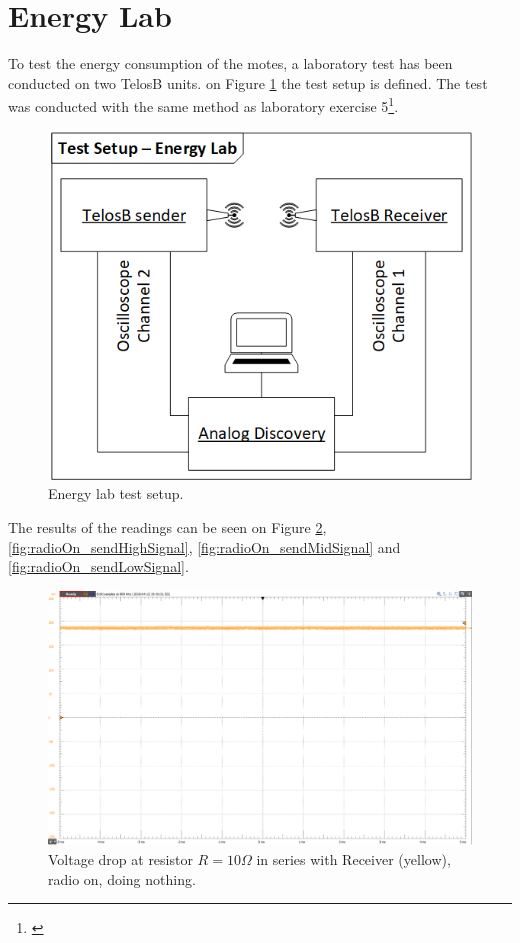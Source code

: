 \section{Energy Lab}\label{sc:energylab}

To test the energy consumption of the motes, a laboratory test has been conducted on two TelosB units. on Figure \ref{fig:energyLab_testSetup} the test setup is defined. The test was conducted with the same method as laboratory exercise 5\footnote{\cite{Madsen}}.

\begin{figure}[H]
	\centering
	\includegraphics[width=0.8\linewidth]{implementation/energylab/fig/energyLab_testSetup.png}
	\caption{Energy lab test setup.}
	\label{fig:energyLab_testSetup}
\end{figure}

\noindent The results of the readings can be seen on Figure \ref{fig:radioOn_idle}, \ref{fig:radioOn_sendHighSignal}, \ref{fig:radioOn_sendMidSignal} and \ref{fig:radioOn_sendLowSignal}.

\begin{figure}[H]
	\centering
	\includegraphics[width=0.8\linewidth]{implementation/energylab/fig/radioOn_idle.png}
	\caption{Voltage drop at resistor $R=10\Omega$ in series with Receiver (yellow), radio on, doing nothing.}
	\label{fig:radioOn_idle}
\end{figure}

